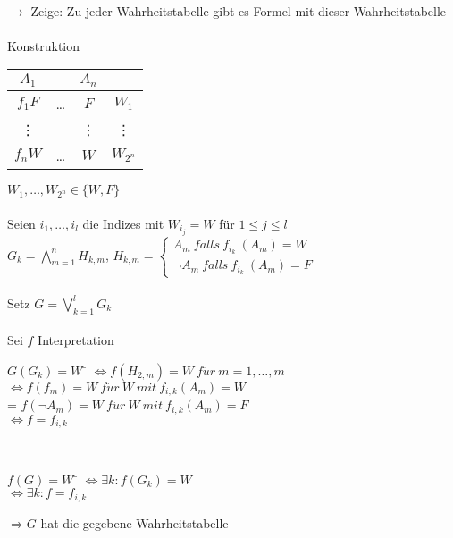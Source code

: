 \noindent\\
$\rightarrow$ Zeige: Zu jeder Wahrheitstabelle gibt es Formel mit dieser Wahrheitstabelle\\
    
\noindent\\
Konstruktion\\

\begin{tabular}{c|c|c|c}
$A_1$ &  & $A_n$ &  \\
\hline
$f_1 F$ & … & $F$ & $W_1$\\
\vdots   &  & \vdots & \vdots \\
$f_n W$ & … & $W$ & $W_{2^n}$ \\
\end{tabular}
\hspace{1cm}$W_1, …, W_{2^n} \in \{W, F\}$\\
    
\noindent\\
Seien $i_1, …, i_l$ die Indizes mit $W_{i_j} = W$ für $1 \leq j \leq l$\\
$G_k = \bigwedge_{m=1}^n H_{k,m}$, $H_{k,m} = \begin{cases} A_m\ falls\ f_{i_k}\ (A_m)=W \\ \neg A_m\ falls\ f_{i_k}\ (A_m)=F \end{cases}$\\
    
\noindent\\
Setz $G = \bigvee_{k=1}^l G_k$\\
    
\noindent\\
Sei $f$ Interpretation\\
\begin{tabbing}
$G(G_k) = W$ \= $\Leftrightarrow f(H_{2,m}) = W\ f\ddot{u}r\ m=1, …, m$\\
\> $\Leftrightarrow f(f_m) = W\ f\ddot{u}r\ W\ mit\ f_{i,k}(A_m) = W$\\
\> = $f(\neg A_m) = W\ f\ddot{u}r\ W\ mit\ f_{i,k}(A_m) = F$\\
\> $\Leftrightarrow f = f_{i,k}$\\
\end{tabbing}

\noindent\\
\begin{tabbing}
$f(G) = W$ \= $\Leftrightarrow \exists k : f(G_k) = W$\\
\> $\Leftrightarrow \exists k: f= f_{i,k}$\\
\end{tabbing}
$\Rightarrow G$ hat die gegebene Wahrheitstabelle\\

